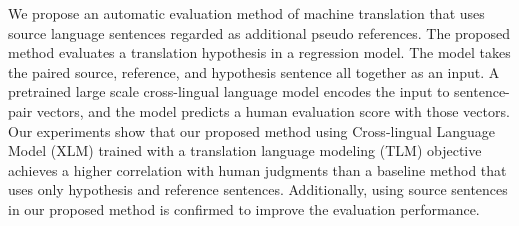 We propose an automatic evaluation method of machine translation that uses source language sentences regarded as additional pseudo references. The proposed method evaluates a translation hypothesis in a regression model. The model takes the paired source, reference, and hypothesis sentence all together as an input. A pretrained large scale cross-lingual language model encodes the input to sentence-pair vectors, and the model predicts a human evaluation score with those vectors. Our experiments show that our proposed method using Cross-lingual Language Model (XLM) trained with a translation language modeling (TLM) objective achieves a higher correlation with human judgments than a baseline method that uses only hypothesis and reference sentences. Additionally, using source sentences in our proposed method is confirmed to improve the evaluation performance.
